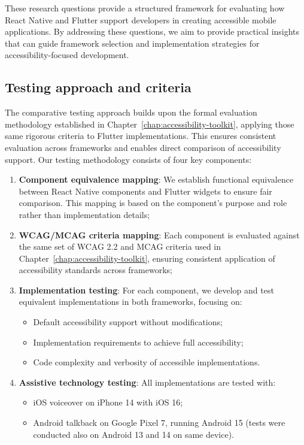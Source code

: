 These research questions provide a structured framework for evaluating how React Native and Flutter support developers in creating accessible mobile applications. By addressing these questions, we aim to provide practical insights that can guide framework selection and implementation strategies for accessibility-focused development.

\subsection{Testing approach and criteria}

The comparative testing approach builds upon the formal evaluation methodology established in Chapter~\ref{chap:accessibility-toolkit}, applying those same rigorous criteria to Flutter implementations. This ensures consistent evaluation across frameworks and enables direct comparison of accessibility support. Our testing methodology consists of four key components:

\begin{enumerate}
    \item \textbf{Component equivalence mapping}: We establish functional equivalence between React Native components and Flutter widgets to ensure fair comparison. This mapping is based on the component's purpose and role rather than implementation details;
    
    \item \textbf{WCAG/MCAG criteria mapping}: Each component is evaluated against the same set of WCAG 2.2 and MCAG criteria used in Chapter~\ref{chap:accessibility-toolkit}, ensuring consistent application of accessibility standards across frameworks;
    
    \item \textbf{Implementation testing}: For each component, we develop and test equivalent implementations in both frameworks, focusing on:
    \begin{itemize}
        \item Default accessibility support without modifications;
        \item Implementation requirements to achieve full accessibility;
        \item Code complexity and verbosity of accessible implementations.
    \end{itemize}
    
    \item \textbf{Assistive technology testing}: All implementations are tested with:
    \begin{itemize}
        \item iOS \gls{voiceover} on iPhone 14 with iOS 16;
        \item Android \gls{talkback} on Google Pixel 7, running Android 15 (tests were conducted also on Android 13 and 14 on same device).
    \end{itemize}
\end{enumerate}

